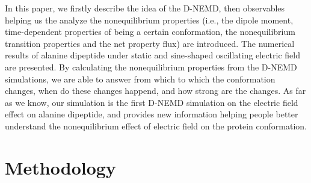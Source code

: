 \documentclass[aip,jcp,a4paper,preprint,onecolumn]{revtex4-1}
\begin{document}
In this paper, we firstly describe the idea of the D-NEMD, then
observables helping us the analyze the nonequilibrium properties
(i.e., the dipole moment, time-dependent properties of being a certain
conformation, the nonequilibrium transition properties and the net
property flux) are introduced. The numerical results of alanine
dipeptide under static and sine-shaped oscillating electric field are
presented. By calculating the nonequilibrium properties from the D-NEMD
simulations, we are able to answer from which to which the conformation
changes, when do these changes happend, and how strong are the changes.
As far as we know, our simulation is the first D-NEMD simulation
on the electric field effect on alanine dipeptide, and provides new
information helping people better understand the nonequilibrium
effect of electric field on the protein conformation.



\section{Methodology}
\end{document}
